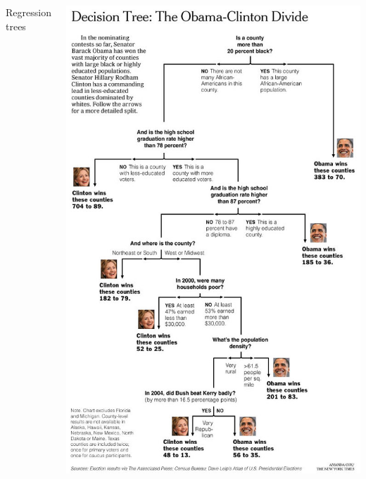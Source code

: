 \documentclass[mathserif, aspectratio=169]{beamer}
\begin{document}
\begin{frame}

\begin{columns}
\begin{center}
{\LARGE Regression trees}
\end{center}
\includegraphics[height=\textheight]{NYT_tree}
\end{columns}
\end{frame}
\end{document}
